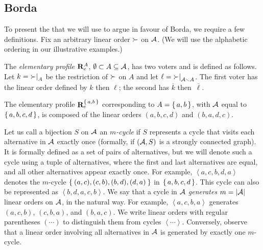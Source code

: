 \documentclass{comsoc2016}
\begin{document}

\subsection{Borda \laxiomatisationtitle}
To present the \laxiomatisation{} that we will use to argue in favour of 
Borda, we require a few definitions. Fix an arbitrary linear order $\succ$ on $\mathcal{A}$. (We will use the alphabetic ordering in our illustrative examples.)

\begin{definition}
	The \emph{elementary profile} $\mathbf{R}^{A}_e$, $\emptyset \subset A \subseteq \mathcal{A}$, has two voters and is defined as follows. Let $k = {{\succ}|}_{A}$ be the restriction of ${\succ}$ on $A$ and let $\ell = {{\succ}|}_{\mathcal{A} \smallsetminus A}$. The first voter has the linear order defined by $k$ then $\ell$; the second has $\overline{k}$ then~$\overline{\ell}$.
\end{definition}

\begin{example}
	The elementary profile $\mathbf{R}^{\set{a, b}}_e$ corresponding to $A = \set{a, b}$, with $\mathcal{A}$ equal to $\set{a, b, c, d}$, is composed of the linear orders $(a, b, c, d)$ and $(b, a, d, c)$.
\end{example}

Let us call a bijection $S$ on $\mathcal{A}$ an \emph{$m$-cycle} if $S$ represents a cycle that visits each alternative in $\mathcal{A}$ exactly once (formally, if $(\mathcal{A}, S)$ is a strongly connected graph).
It is formally defined as a set of pairs of alternatives, but we will denote such a cycle using a tuple of alternatives, where the first and last alternatives are equal, and all other alternatives appear exactly once. For example, $\left<a, c, b, d, a\right>$ denotes the $m$-cycle $\Set{(a, c), (c, b), (b, d), (d, a)}$ in $\set{a, b, c, d}$.  This cycle can also be represented as $\left<b, d, a, c, b\right>$.
We say that a cycle in $\mathcal{A}$ \emph{generates} $m=\lvert{\mathcal{A}}\rvert$ linear orders on $\mathcal{A}$, in the natural way. For example, $\left<a, c, b, a\right>$ generates $\left(a, c, b\right)$, $\left(c, b, a\right)$, and $\left(b, a, c\right)$. We write linear orders with regular parentheses $(\cdots)$ to distinguish them from cycles $\left<\cdots\right>$. Conversely, observe that a linear order involving all alternatives in $\mathcal{A}$ is generated by exactly one $m$-cycle.
\end{document}
